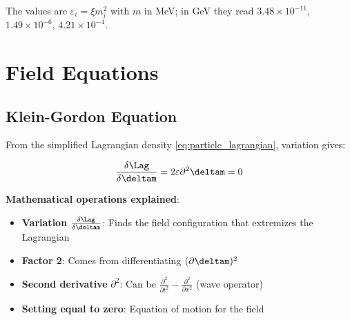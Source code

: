 	\begin{table}[htbp]
		\centering
		\caption{Unified description of the lepton family}
		\label{tab:lepton_parameters}
	\end{table}
	The values are $\varepsilon_i = \xi m_i^2$ with $m$ in MeV; in GeV they read $3.48\times10^{-11}$, $1.49\times10^{-6}$, $4.21\times10^{-4}$.
	
	\section{Field Equations}
	
	\subsection{Klein-Gordon Equation}
	
	From the simplified Lagrangian density \eqref{eq:particle_lagrangian}, variation gives:
	
	\begin{equation}
		\frac{\delta \Lag}{\delta \deltam} = 2\varepsilon \partial^2 \deltam = 0
	\end{equation}
	
	\textbf{Mathematical operations explained}:
	\begin{itemize}
		\item \textbf{Variation} $\frac{\delta \Lag}{\delta \deltam}$: Finds the field configuration that extremizes the Lagrangian
		\item \textbf{Factor 2}: Comes from differentiating $(\partial \deltam)^2$
		\item \textbf{Second derivative} $\partial^2$: Can be $\frac{\partial^2}{\partial t^2} - \frac{\partial^2}{\partial x^2}$ (wave operator)
		\item \textbf{Setting equal to zero}: Equation of motion for the field
	\end{itemize}
	
